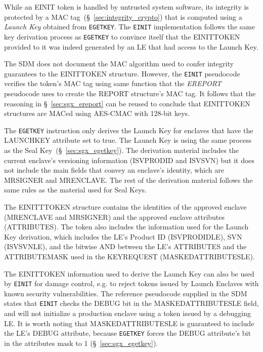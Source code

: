 While an EINIT token is handled by untrusted system software, its integrity is
protected by a MAC tag~(\S~\ref{sec:integrity_crypto}) that is computed using a
\textit{Launch Key} obtained from \texttt{EGETKEY}. The \texttt{EINIT}
implementation follows the same key derivation process as \texttt{EGETKEY} to
convince itself that the EINITTOKEN provided to it was indeed generated by an
LE that had access to the Launch Key.

The SDM does not document the MAC algorithm used to confer integrity guarantees
to the EINITTOKEN structure. However, the \texttt{EINIT} pseudocode verifies
the token's MAC tag using same function that the \textit{EREPORT} pseudocode
uses to create the REPORT structure's MAC tag. It follows that the reasoning in
\S~\ref{sec:sgx_ereport} can be reused to conclude that EINITTOKEN structures
are MACed using AES-CMAC with 128-bit keys.


The \texttt{EGETKEY} instruction only derives the Launch Key for enclaves that
have the LAUNCHKEY attribute set to true. The Launch Key is using the same
process as the Seal Key~(\S~\ref{sec:sgx_egetkey}). The derivation material
includes the current enclave's versioning information (ISVPRODID and ISVSVN)
but it does not include the main fields that convey an enclave's identity,
which are MRSIGNER and MRENCLAVE. The rest of the derivation material follows
the same rules as the material used for Seal Keys.

The EINITTTOKEN structure contains the identities of the approved enclave
(MRENCLAVE and MRSIGNER) and the approved enclave attributes (ATTRIBUTES). The
token also includes the information used for the Launch Key derivation,
which includes the LE's Product ID (ISVPRODIDLE), SVN (ISVSVNLE), and the
bitwise AND between the LE's ATTRIBUTES and the ATTRIBUTEMASK used in the
KEYREQUEST (MASKEDATTRIBUTESLE).

The EINITTOKEN information used to derive the Launch Key can also be used
by \texttt{EINIT} for damage control, e.g. to reject tokens issued by Launch
Enclaves with known security vulnerabilities. The reference pseudocode supplied
in the SDM states that \texttt{EINIT} checks the DEBUG bit in the
MASKEDATTRIBUTESLE field, and will not initialize a production enclave using
a token issued by a debugging LE. It is worth noting that MASKEDATTRIBUTESLE is
guaranteed to include the LE's DEBUG attribute, because \texttt{EGETKEY} forces
the DEBUG attribute's bit in the attributes mask to 1
(\S~\ref{sec:sgx_egetkey}).

